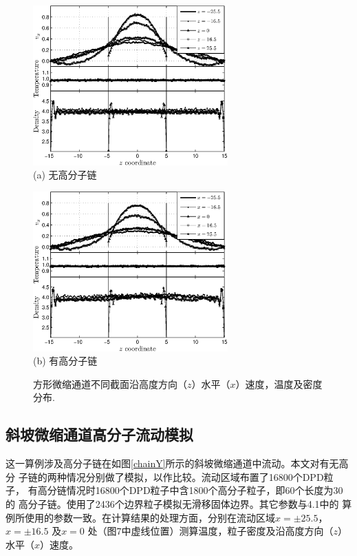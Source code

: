 \documentclass[twoside,12pt]{article}
\begin{document}
\begin{figure}[!htb]
\centering
\begin{minipage}[c]{0.5\textwidth}
\centering
\includegraphics[width=7.5cm]{./figures/Tprof.eps}\\
\small (a) 无高分子链
\end{minipage}%
\begin{minipage}[c]{0.5\textwidth}
\centering
\includegraphics[width=7.5cm]{./figures/chainTprof.eps}\\
\small (b) 有高分子链
\end{minipage}
\caption{\label{chainTprof}\small 方形微缩通道不同截面沿高度方向（$z$）水平（$x$）速度，温度及密度分布.}
\end{figure}




\subsection{ 斜坡微缩通道高分子流动模拟}

这一算例涉及高分子链在如图\ref{chainY}所示的斜坡微缩通道中流动。本文对有无高分
子链的两种情况分别做了模拟，以作比较。流动区域布置了16800个DPD粒子，
有高分链情况时16800个DPD粒子中含1800个高分子粒子，即60个长度为30的
高分子链。使用了2436个边界粒子模拟无滑移固体边界。其它参数与4.1中的
算例所使用的参数一致。在计算结果的处理方面，分别在流动区域$x=\pm 25.5$， $x=\pm 16.5$ 及$x=0$ 处（图7中虚线位置）测算温度，粒子密度及沿高度方向（$z$）水平（$x$）速度。
\end{document}
